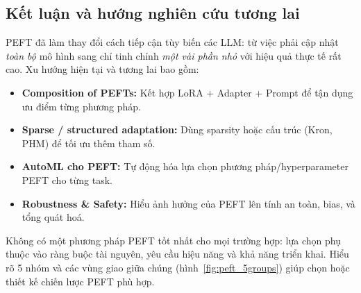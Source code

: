 \subsection{Kết luận và hướng nghiên cứu tương lai}
\label{ssec:conclusion}
PEFT đã làm thay đổi cách tiếp cận tùy biến các LLM: từ việc phải cập nhật \emph{toàn bộ} mô hình sang chỉ tinh chỉnh \emph{một vài phần nhỏ} với hiệu quả thực tế rất cao.  
Xu hướng hiện tại và tương lai bao gồm:
\begin{itemize}
	\item \textbf{Composition of PEFTs:} Kết hợp LoRA + Adapter + Prompt để tận dụng ưu điểm từng phương pháp.
	\item \textbf{Sparse / structured adaptation:} Dùng sparsity hoặc cấu trúc (Kron, PHM) để tối ưu thêm tham số.
	\item \textbf{AutoML cho PEFT:} Tự động hóa lựa chọn phương pháp/hyperparameter PEFT cho từng task.
	\item \textbf{Robustness \& Safety:} Hiểu ảnh hưởng của PEFT lên tính an toàn, bias, và tổng quát hoá.
\end{itemize}

Không có một phương pháp PEFT tốt nhất cho mọi trường hợp: lựa chọn phụ thuộc vào ràng buộc tài nguyên, yêu cầu hiệu năng và khả năng triển khai. Hiểu rõ 5 nhóm và các vùng giao giữa chúng (hình~\ref{fig:peft_5groups}) giúp chọn hoặc thiết kế chiến lược PEFT phù hợp.